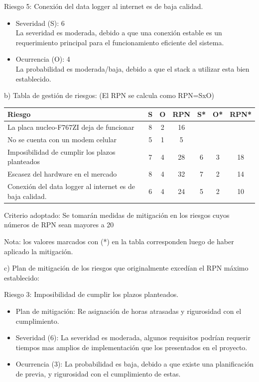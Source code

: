\documentclass[
11pt, %
]{charter}
\begin{document}
Riesgo 5: Conexión del data logger al internet es de baja calidad.
\begin{itemize}
	\item Severidad (S): 6 \\
	La severidad es moderada, debido a que una conexión estable es un requerimiento principal para el funcionamiento eficiente del sistema.
	\item Ocurrencia (O): 4 \\
	La probabilidad es moderada/baja, debido a que el stack a utilizar esta bien establecido.
\end{itemize}

b) Tabla de gestión de riesgos:      (El RPN se calcula como RPN=SxO)

\begin{table}[htpb]
\centering
\begin{tabularx}{\linewidth}{@{}|X|c|c|c|c|c|c|@{}}
\hline
\rowcolor[HTML]{C0C0C0} 
Riesgo & S & O & RPN & S* & O* & RPN* \\ \hline
La placa nucleo-F767ZI deja de funcionar       &  8 &  2 &  16   &    &    &      \\ \hline
No se cuenta con un modem celular       & 5  & 1  &  5   &    &    &      \\ \hline
Imposibilidad de cumplir los plazos planteados       &  7 & 4  &  28   &  6  & 3    &   18   \\ \hline
Escasez del hardware en el mercado       &  8 & 4  &  32  &  7  & 2   &  14    \\ \hline
Conexión del data logger al internet es de baja calidad.       & 6  & 4  &  24   &  5  &  2  &     10 \\ \hline
\end{tabularx}%
\end{table}

Criterio adoptado: 
Se tomarán medidas de mitigación en los riesgos cuyos números de RPN sean mayores a 20

Nota: los valores marcados con (*) en la tabla corresponden luego de haber aplicado la mitigación.

c) Plan de mitigación de los riesgos que originalmente excedían el RPN máximo establecido:
 
Riesgo 3: Imposibilidad de cumplir los plazos planteados.
\begin{itemize}
	\item Plan de mitigación: Re asignación de horas atrasadas y rigurosidad con el cumplimiento.
	\item Severidad (6): La severidad es moderada, algunos requisitos podrían requerir tiempos mas amplios de implementación que los presentados en el proyecto.
	\item Ocurrencia (3): La probabilidad es baja, debido a que existe una planificación de previa, y rigurosidad con el cumplimiento de estas.
\end{itemize}
\end{document}
